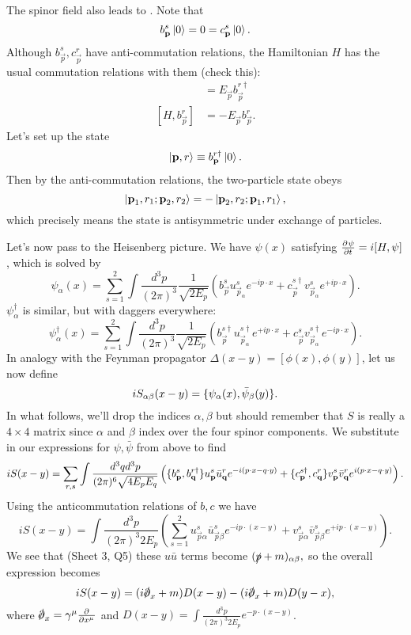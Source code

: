 The spinor field also leads to . Note that
$$b_{\vec p}^s\ket{0}=0=c_{\vec p}^s\ket{0}.$$ Although $b_{\vec p}^s, c_{\vec p}^r$ have anti-commutation relations, the Hamiltonian $H$ has the usual commutation relations with them (check this):
\begin{align*}
    [H,b_{\vec p}^{r\dagger}]&= E_{\vec p} b_{\vec p}^{r\dagger}\\
    [H,b_{\vec p}^r]&= -E_{\vec p}b_{\vec p}^r.
\end{align*}
Let's set up the state
$$\ket{\vec p, r}\equiv b_{\vec p}^{r\dagger}\ket{0}.$$
Then by the anti-commutation relations, the two-particle state obeys
$$\ket{\vec p_1,r_1; \vec p_2,r_2}=-\ket{\vec p_2,r_2; \vec p_1,r_1},$$
which precisely means the state is antisymmetric under exchange of particles.

Let's now pass to the Heisenberg picture. We have $\psi(x)$ satisfying $\P{\psi}{t}=i[H,\psi]$, which is solved by
$$\psi_\alpha(x)=\sum_{s=1}^2 \int \frac{d^3p}{(2\pi)^3}\frac{1}{\sqrt{2E_p}} (b_{\vec p}^s u_{\vec p_\alpha}^s e^{-ip\cdot x} + c_{\vec p}^{s\dagger}v_{\vec p_\alpha}^s e^{+ip\cdot x}).$$
$\psi_\alpha^\dagger$ is similar, but with daggers everywhere:
$$\psi_\alpha^\dagger(x)= \sum_{s=1}^2 \int \frac{d^3p}{(2\pi)^3}\frac{1}{\sqrt{2E_p}} (b_{\vec p}^{s\dagger} u_{\vec p_\alpha}^{s\dagger} e^{+ip\cdot x} + c_{\vec p}^{s}v_{\vec p_\alpha}^{s\dagger} e^{-ip\cdot x}).$$
In analogy with the Feynman propagator $\Delta(x-y)=[\phi(x),\phi(y)]$, let us now define
$$iS_{\alpha\beta}(x-y)=\set{\psi_\a (x),\bar \psi_\beta(y)}.$$
In what follows, we'll drop the indices $\alpha,\beta$ but should remember that $S$ is really a $4\times 4$ matrix since $\alpha$ and $\beta$ index over the four spinor components. We substitute in our expressions for $\psi,\bar\psi$ from above to find
\begin{equation}
iS(x-y)=\sum_{r,s} \int \frac{d^3q d^3p}{(2\pi)^6 \sqrt{4 E_p E_q}} \left(\set{b_{\vec p}^s, b_{\vec q}^{r\dagger}}u_{\vec p}^s \bar u_{\vec q}^r e^{-i(p\cdot x-q\cdot y)}
+\set{c_{\vec p}^{s\dagger},c_{\vec q}^r}v_{\vec p}^s \bar v_{\vec q}^r e^{i(p\cdot x-q\cdot y)} \right).
\end{equation}
Using the anticommutation relations of $b,c$ we have
$$iS(x-y)=\int \frac{d^3p}{(2\pi)^3 2E_p}\left(\sum_{s=1}^2 u_{\vec p\alpha}^s \bar u_{\vec p\beta}^s e^{-ip \cdot(x-y)}+v_{\vec p\alpha}^s \bar v_{\vec p\beta}^s e^{+ip\cdot(x-y)}\right).$$
We see that (Sheet 3, Q5) these $u\bar u$ terms become $(\slashed{p}+m)_{\alpha\beta},$ so the overall expression becomes
$$iS(x-y)=(i\slashed{\p}_x +m)D(x-y)-(i\slashed \p_x+m)D(y-x),$$
where $\slashed \p_x = \gamma^\mu \P{}{{x^\mu}}$ and $D(x-y)=\int \frac{d^3p}{(2\pi)^3 2E_p} e^{-p\cdot(x-y)}$.


